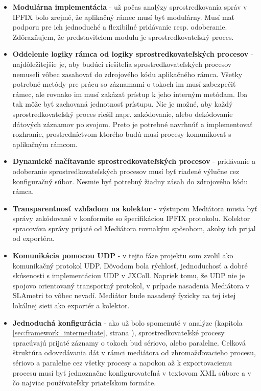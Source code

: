 \begin{itemize}
 \item \textbf{Modulárna implementácia} - už počas analýzy sprostredkovania správ v IPFIX bolo zrejmé, že 
 aplikačný rámec musí byť modulárny. Musí mať podporu pre ich jednoduché a flexibilné pridávanie resp. 
 odoberanie. Zdôrazňujem, že predstaviteľom modulu je sprostredkovateľský proces.
 
  \item \textbf{Oddelenie logiky rámca od logiky sprostredkovateľských procesov} - 
  najdôležitejšie je, aby budúci riešitelia sprostredkovateľských procesov nemuseli vôbec zasahovať 
  do zdrojového kódu aplikačného rámca. Všetky potrebné metódy pre prácu so záznamami o tokoch 
  im musí zabezpečiť rámec, ale rovnako im musí zakázať prístup k jeho interným metódam. 
  Iba tak môže byť zachovaná jednotnosť prístupu. Nie je možné, aby každý sprostredkovateľský proces 
  riešil napr. zakódovanie, alebo dekódovanie dátových záznamov po svojom. Preto je potrebné navrhnúť 
  a implementovať rozhranie, prostredníctvom ktorého budú musí  procesy komunikovať s aplikačným rámcom.
  
 \item \textbf{Dynamické načítavanie sprostredkovateľských procesov} - pridávanie a odoberanie 
 sprostredkovateľských procesov musí byť riadené výlučne cez konfiguračný súbor. Nesmie byť potrebný 
 žiadny zásah do zdrojového kódu  rámca.
 
 \item \textbf{Transparentnosť vzhľadom na kolektor} - výstupom Mediátora musia byť správy zakódované 
 v konformite so špecifikáciou IPFIX protokolu. Kolektor spracováva správy prijaté od Mediátora rovnakým
 spôsobom, akoby ich prijal od exportéra.
 
 \item \textbf{Komunikácia pomocou UDP} - v tejto fáze projektu som zvolil ako komunikačný protokol UDP.
 Dôvodom bola rýchlosť, jednoduchosť a dobré skúsenosti s implementáciou UDP v JXColl. Napriek tomu, že 
 UDP nie je  spojovo orientovaný transportný protokol, v prípade nasadenia Mediátora v SLAmetri to vôbec
 nevadí. Mediátor bude nasadený fyzicky na tej istej lokálnej sieti ako exportér a kolektor. 
 
 \item \textbf{Jednoduchá konfigurácia} - ako už bolo spomenuté v analýze 
 (kapitola \ref{sec:framework_intermediate}, strana \pageref{sec:framework_intermediate}), 
 sprostredkovateľské procesy spracúvajú prijaté záznamy o tokoch bud sériovo, alebo paralelne. 
 Celková štruktúra odovzdávania dát v rámci mediátora od zhromažďovacieho procesu, sériovo a paralelne cez 
 všetky procesy a napokon až k exportovaciemu procesu musí byť jednoznačne konfigurovateľná v textovom 
 XML súbore a v čo najviac používateľsky priateľskom formáte. 
 

\end{itemize}

